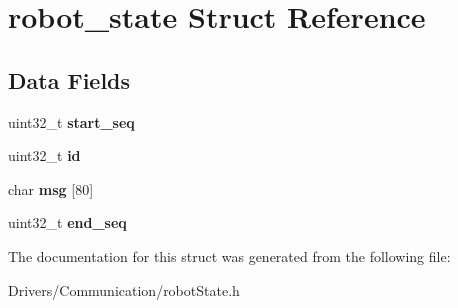 \hypertarget{structrobot__state}{}\section{robot\+\_\+state Struct Reference}
\label{structrobot__state}
\subsection*{Data Fields}
\begin{DoxyCompactItemize}
\item 
\mbox{\label{structrobot__state_ae237ee7fa149fb1a40b8badc494744bb}} 
uint32\+\_\+t {\bfseries start\+\_\+seq}
\item 
\mbox{\label{structrobot__state_abaabdc509cdaba7df9f56c6c76f3ae19}} 
uint32\+\_\+t {\bfseries id}
\item 
\mbox{\label{structrobot__state_a3d523ddd4d9b8eafb9241f3c94fc66da}} 
char {\bfseries msg} \mbox{[}80\mbox{]}
\item 
\mbox{\label{structrobot__state_ab7fcef41c32448ba17572576c2c808df}} 
uint32\+\_\+t {\bfseries end\+\_\+seq}
\end{DoxyCompactItemize}


The documentation for this struct was generated from the following file\+:\begin{DoxyCompactItemize}
\item 
Drivers/\+Communication/robot\+State.\+h\end{DoxyCompactItemize}
